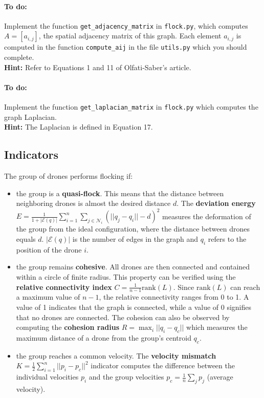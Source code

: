 \documentclass{article}
\begin{document}
\paragraph{To do:} 
Implement the function \texttt{get\_adjacency\_matrix} in \texttt{flock.py}, which computes $A=[a_{i,j}]$, the spatial adjacency matrix of this graph. Each element $a_{i,j}$ is computed in the function \texttt{compute\_aij} in the file \texttt{utils.py} which you should complete.\\
\textbf{Hint:} Refer to Equations 1 and 11 of Olfati-Saber's article.

\paragraph{To do:} 
Implement the function \texttt{get\_laplacian\_matrix} in \texttt{flock.py} which computes the graph Laplacian.\\
\textbf{Hint:} The Laplacian is defined in Equation 17.

\subsection{Indicators}
The group of drones performs flocking if:
\begin{itemize}
 \item the group is a \textbf{quasi-flock}. This means that the distance between neighboring drones is almost the desired distance $d$. The \textbf{deviation energy} $E = \frac{1}{1+|\mathcal{E}(q)|}\sum_{i=1}^n\sum_{j\in \mathcal{N}_i }(||q_j-q_i||-d)^2$ measures the deformation of the group from the ideal configuration, where the distance between drones equals $d$. $|\mathcal{E}(q)|$ is the number of edges in the graph and $q_i$ refers to the position of the drone $i$.
 
 \item the group remains \textbf{cohesive}. All drones are then connected and contained within a circle of finite radius. This property can be verified using the \textbf{relative connectivity index} $C = \frac{1}{n-1} \mathrm{rank}(L)$. Since $\mathrm{rank}(L)$ can reach a maximum value of $n-1$, the relative connectivity ranges from 0 to 1. A value of 1 indicates that the graph is connected, while a value of 0 signifies that no drones are connected.
 The cohesion can also be observed by computing the \textbf{cohesion radius} $R = \max_i ||q_i - q_c||$ which measures the maximum distance of a drone from the group’s centroid $q_c$. 
 
 \item the group reaches a common velocity. The \textbf{velocity mismatch} $K = \frac{1}{2}\sum_{i=1}^n ||p_i - p_c||^2$ indicator computes the difference between the individual velocities $p_i$ and the group velocities $p_c = \frac{1}{n}\sum_j p_j$ (average velocity).
 
\end{itemize}
\end{document}
